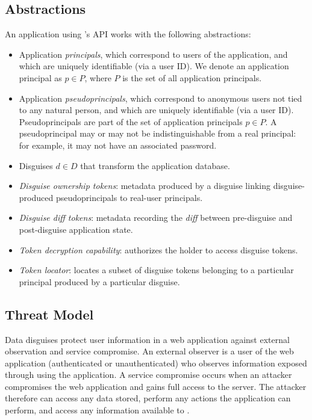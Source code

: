 \subsection{\sys Abstractions}
An application using \sys's API works with the following \sys abstractions:
\begin{itemize}
    \item Application \emph{principals}, which correspond to users of the application, 
	and which are uniquely identifiable (\eg via a user ID).
	We denote an application principal as $p \in P$, where $P$ is the set of all application principals.
    \item Application \emph{pseudoprincipals}, which correspond to anonymous users not tied to any natural
    person, and which are uniquely identifiable (\eg via a user ID).
	Pseudoprincipals are part of the set of application principals $p \in P$.
    A pseudoprincipal may or may not be indistinguishable from a real principal: for example, it 
        may not have an associated password.
    \item Disguises $d \in D$ %
        that transform the application database.
    \item \emph{Disguise ownership tokens}: metadata produced by a disguise linking
        disguise-produced pseudoprincipals to real-user principals.
    \item \emph{Disguise diff tokens}: metadata recording the \emph{diff} between pre-disguise and
        post-disguise application state.
    \item \emph{Token decryption capability}: authorizes the holder to access disguise tokens.
    \item \emph{Token locator}: locates a subset of disguise tokens belonging to a particular
        principal produced by a particular disguise.
\end{itemize}

\subsection{Threat Model}
\label{s:threat}

%
Data disguises protect user information in a web application against external observation
and service compromise.
%
An external observer is a user of the web application (authenticated or unauthenticated) who
observes information exposed through using the application.
%
A service compromise occurs when an attacker compromises the web application and 
gains full access to the server.
%
The attacker therefore can access any data stored, perform any actions the application can
perform, and access any information available to \sys.
%

